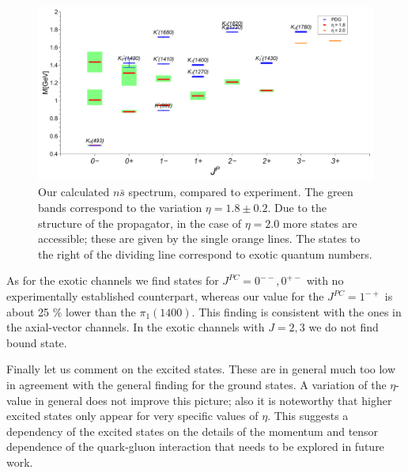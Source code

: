 \begin{figure}[h]
\begin{center}
\includegraphics[width=0.999\textwidth]{figures/spectrum_ns}
\caption{\footnotesize Our calculated $n\bar{s}$ spectrum, compared to experiment. The green bands 
correspond to the variation $\eta=1.8\pm0.2$. Due to the structure of the propagator, in the case 
of $\eta=2.0$ more states are accessible; these are given by the single orange lines. The states 
to the right of the dividing line correspond to exotic quantum numbers.
 }\label{fig:spectrumns}
\end{center}
\end{figure}
As for the exotic channels we find states for $J^{PC}=0^{--},0^{+-}$ with no experimentally established
counterpart, whereas our value for the $J^{PC}=1^{-+}$ is about 25 $\%$ lower than the $\pi_1(1400)$.
This finding is consistent with the ones in the axial-vector channels. In the exotic channels
with $J=2,3$ we do not find bound state.

Finally let us comment on the excited states. These are in general much too low \cite{Holl:2004fr}
in agreement with the general finding for the ground states. A variation of the $\eta$-value
in general does not improve this picture; also it is noteworthy that higher excited states only
appear for very specific values of $\eta$. This suggests a dependency of the excited states on 
the details of the momentum and tensor dependence of the quark-gluon interaction that needs to be explored 
in future work. \\

